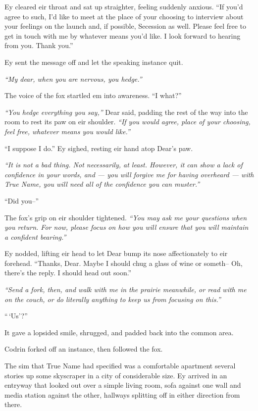 Ey cleared eir throat and sat up straighter, feeling suddenly anxious. ``If you'd agree to such, I'd like to meet at the place of your choosing to interview about your feelings on the launch and, if possible, Secession as well. Please feel free to get in touch with me by whatever means you'd like. I look forward to hearing from you. Thank you.''

Ey sent the message off and let the speaking instance quit.

\emph{``My dear, when you are nervous, you hedge.''}

The voice of the fox startled em into awareness. ``I what?''

\emph{``You hedge everything you say,''} Dear said, padding the rest of the way into the room to rest its paw on eir shoulder. \emph{``If you would agree, place of your choosing, feel free, whatever means you would like.''}

``I suppose I do.'' Ey sighed, resting eir hand atop Dear's paw.

\emph{``It is not a bad thing. Not necessarily, at least. However, it can show a lack of confidence in your words, and — you will forgive me for having overheard — with True Name, you will need all of the confidence you can muster.''}

``Did you--''

The fox's grip on eir shoulder tightened. \emph{``You may ask me your questions when you return. For now, please focus on how you will ensure that you will maintain a confident bearing.''}

Ey nodded, lifting eir head to let Dear bump its nose affectionately to eir forehead. ``Thanks, Dear. Maybe I should chug a glass of wine or someth-- Oh, there's the reply. I should head out soon.''

\emph{``Send a fork, then, and walk with me in the prairie meanwhile, or read with me on the couch, or do literally anything to keep us from focusing on this.''}

``\,`Us'?''

It gave a lopsided smile, shrugged, and padded back into the common area.

Codrin forked off an instance, then followed the fox.

The sim that True Name had specified was a comfortable apartment several stories up some skyscraper in a city of considerable size. Ey arrived in an entryway that looked out over a simple living room, sofa against one wall and media station against the other, hallways splitting off in either direction from there.

